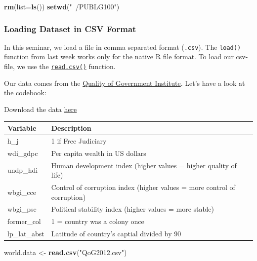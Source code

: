 \documentclass[]{article}
\newenvironment{Shaded}{\begin{snugshade}}{\end{snugshade}}
\newcommand{\KeywordTok}[1]{\textcolor[rgb]{0.13,0.29,0.53}{\textbf{#1}}}
\newcommand{\DataTypeTok}[1]{\textcolor[rgb]{0.13,0.29,0.53}{#1}}
\newcommand{\StringTok}[1]{\textcolor[rgb]{0.31,0.60,0.02}{#1}}
\newcommand{\NormalTok}[1]{#1}
\theoremstyle{definition}
\theoremstyle{definition}
\theoremstyle{definition}
\theoremstyle{remark}
\begin{document}
\begin{Shaded}
\begin{Highlighting}[]
\KeywordTok{rm}\NormalTok{(}\DataTypeTok{list=}\KeywordTok{ls}\NormalTok{())}
\KeywordTok{setwd}\NormalTok{(}\StringTok{"~/PUBLG100"}\NormalTok{)}
\end{Highlighting}
\end{Shaded}

\subsubsection{Loading Dataset in CSV
Format}\label{loading-dataset-in-csv-format}

In this seminar, we load a file in comma separated format
(\texttt{.csv}). The \texttt{load()} function from last week works only
for the native R file format. To load our csv-file, we use the
\href{https://stat.ethz.ch/R-manual/R-devel/library/utils/html/read.table.html}{\texttt{read.csv()}}
function.

Our data comes from the \href{http://qog.pol.gu.se/}{Quality of
Government Institute}. Let's have a look at the codebook:

Download the data
\href{https://github.com/philippbroniecki/statistics1/blob/master/data/QoG2012.csv?raw=TRUE}{here}

\begin{tabular}{l|l}
\hline
Variable & Description\\
\hline
h\_j & 1 if Free Judiciary\\
\hline
wdi\_gdpc & Per capita wealth in US dollars\\
\hline
undp\_hdi & Human development index (higher values = higher quality of life)\\
\hline
wbgi\_cce & Control of corruption index (higher values = more control of corruption)\\
\hline
wbgi\_pse & Political stability index (higher values = more stable)\\
\hline
former\_col & 1 = country was a colony once\\
\hline
lp\_lat\_abst & Latitude of country's captial divided by 90\\
\hline
\end{tabular}

\begin{Shaded}
\begin{Highlighting}[]
\NormalTok{world.data <-}\StringTok{ }\KeywordTok{read.csv}\NormalTok{(}\StringTok{"QoG2012.csv"}\NormalTok{)}
\end{Highlighting}
\end{Shaded}
\end{document}
